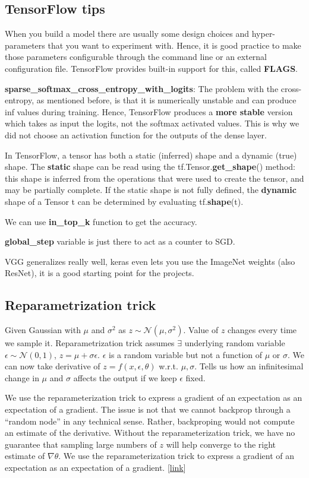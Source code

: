 \documentclass[12pt]{article}
\begin{document}
\subsection{TensorFlow tips}
\par When you build a model there are usually some design choices and hyper-parameters that you want to experiment with. Hence, it is good practice to make those parameters configurable through the command line or an external configuration file. TensorFlow provides built-in support for this, called \textbf{FLAGS}.
\par \textbf{sparse\_softmax\_cross\_entropy\_with\_logits}: The problem with the cross-entropy, as mentioned before, is that it is numerically unstable and can produce inf values during training. Hence, TensorFlow produces a \textbf{more stable} version which takes as input the logits, not the softmax activated values. This is why we did not choose an activation function for the outputs of the dense layer.
\par In TensorFlow, a tensor has both a static (inferred) shape and a dynamic (true) shape. The \textbf{static} shape can be read using the tf.Tensor.\textbf{get\_shape}() method: this shape is inferred from the operations that were used to create the tensor, and may be partially complete. If the static shape is not fully defined, the \textbf{dynamic} shape of a Tensor t can be determined by evaluating tf.\textbf{shape}(t).
\ulb
\item We can use \textbf{in\_top\_k} function to get the accuracy.
\item \textbf{global\_step} variable is just there to act as a counter to SGD.
\item VGG generalizes really well, keras even lets you use the ImageNet weights (also ResNet), it is a good starting point for the projects.
\ule

\subsection{Reparametrization trick}
Given Gaussian with $\mu$ and $\sigma^2$ as $z\sim\mathcal{N}(\mu,\sigma^2)$. Value of $z$ changes every time we sample it. Reparametrization trick assumes $\exists$ underlying random variable $\epsilon\sim\mathcal{N}(0,1)$, $z = \mu + \sigma\epsilon$. $\epsilon$ is a random variable but not a function of $\mu$ or $\sigma$. We can now take derivative of $z = f(x,\epsilon,\theta)$ w.r.t. $\mu , \sigma$. Tells us how an infinitesimal change in $\mu$ and $\sigma$ affects the output if we keep $\epsilon$ fixed.
\par We use the reparameterization trick to express a gradient of an expectation as an expectation of a gradient. The issue is not that we cannot backprop through a “random node” in any technical sense. Rather, backproping would not compute an estimate of the derivative. Without the reparameterization trick, we have no guarantee that sampling large numbers of $z$ will help converge to the right estimate of $\nabla\theta$. We use the reparameterization trick to express a gradient of an expectation as an expectation of a gradient. [\href{http://gregorygundersen.com/blog/2018/04/29/reparameterization/}{link}]
\end{document}
